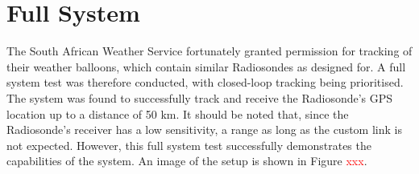 \section{Full System}

The South African Weather Service fortunately granted permission for tracking of their weather balloons, which contain similar Radiosondes as designed for. A full system test was therefore conducted, with closed-loop tracking being prioritised. The system was found to successfully track and receive the Radiosonde's GPS location up to a distance of 50 km. It should be noted that, since the Radiosonde's receiver has a low sensitivity, a range as long as the custom link is not expected. However, this full system test successfully demonstrates the capabilities of the system. An image of the setup is shown in Figure \textcolor{red}{xxx}.
